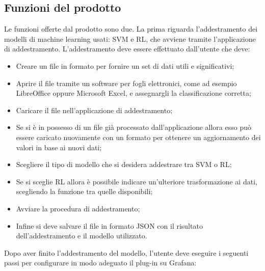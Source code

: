 \documentclass[../analisi-dei-requisiti.tex]{subfiles}
\begin{document}
\subsection{Funzioni del prodotto}
\label{subs:funzioni_del_prodotto}
	Le funzioni offerte dal prodotto sono due.
	La prima riguarda l'addestramento dei modelli di machine learning usati: SVM e RL, che avviene tramite l'applicazione di addestramento. L'addestramento deve essere effettuato dall'utente che deve:
	\begin{itemize}
		\item{Creare un file in formato  per fornire un set di dati utili e significativi;}
		\item{Aprire il file tramite un software per fogli elettronici, come ad esempio LibreOffice oppure Microsoft Excel, e assegnargli la classificazione corretta;}
		\item{Caricare il file nell'applicazione di addestramento;}
		\item{Se si è in possesso di un file già processato dall'applicazione allora esso può essere caricato nuovamente con un formato  per ottenere un aggiornamento dei valori in base ai nuovi dati;}
		\item{Scegliere il tipo di modello che si desidera addestrare tra SVM o RL;}
		\item{Se si sceglie RL allora è possibile indicare un'ulteriore trasformazione ai dati, scegliendo la funzione tra quelle disponibili;}
		\item{Avviare la procedura di addestramento;}
		\item{Infine si deve salvare il file in formato JSON con il risultato dell'addestramento e il modello utilizzato.}
	\end{itemize}
	Dopo aver finito l'addestramento del modello, l'utente deve eseguire i seguenti passi per configurare in modo adeguato il plug-in su Grafana:
\end{document}
